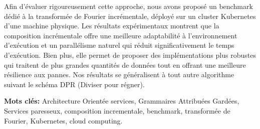 Afin d’évaluer rigoureusement cette approche, nous avons proposé un benchmark dédié à la transformée de Fourier incrémentale, déployé sur un cluster Kubernetes d’une machine physique.
Les résultats expérimentaux montrent que la composition incrémentale offre une meilleure adaptabilité à l’environnement d’exécution et un parallélisme naturel qui réduit significativement le temps d’exécution. Bien plus, elle permet de proposer des implémentations plus robustes qui traitent de plus grandes quantités de données tout en offrant une meilleure résilience aux pannes. Nos résultats se généralisent à tout autre algorithme suivant le schéma DPR (Diviser pour régner).

\vspace{1cm}
\noindent\textbf{Mots clés:} Architecture Orientée services, Grammaires Attribuées Gardées, Services paresseux, composition incrementale, benchmark, transformée de Fourier, Kubernetes, cloud computing.

\myCleanStarChapterEnd

